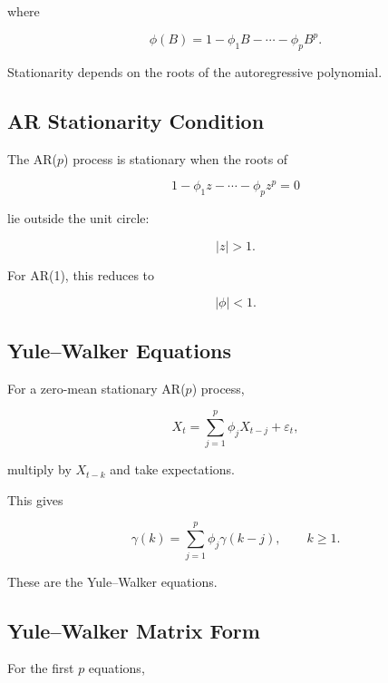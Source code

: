 where

\[
\boxed{
\phi(B)
=
1
-
\phi_1B
-
\cdots
-
\phi_pB^p.
}
\]

Stationarity depends on the roots of the autoregressive polynomial.

\subsection{AR Stationarity Condition}
\label{subsec:ar-stationarity-condition}

The AR(\(p\)) process is stationary when the roots of

\[
\boxed{
1
-
\phi_1z
-
\cdots
-
\phi_pz^p
=
0
}
\]

lie outside the unit circle:

\[
\boxed{
|z|>1.
}
\]

For AR(1), this reduces to

\[
\boxed{
|\phi|<1.
}
\]

\subsection{Yule--Walker Equations}
\label{subsec:yule-walker}

For a zero-mean stationary AR(\(p\)) process,

\[
X_t
=
\sum_{j=1}^{p}
\phi_jX_{t-j}
+
\varepsilon_t,
\]

multiply by \(X_{t-k}\) and take expectations.

This gives

\[
\boxed{
\gamma(k)
=
\sum_{j=1}^{p}
\phi_j
\gamma(k-j),
\qquad
k\geq1.
}
\]

These are the Yule--Walker equations.

\subsection{Yule--Walker Matrix Form}
\label{subsec:yule-walker-matrix}

For the first \(p\) equations,

